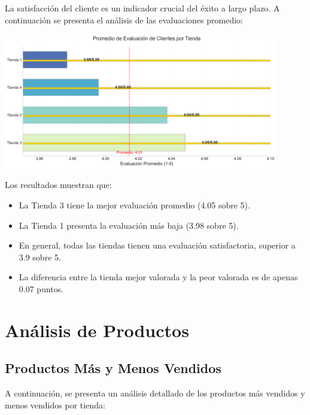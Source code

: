 \documentclass[12pt,a4paper]{report}\usepackage[spanish]{babel}\usepackage[utf8]{inputenc}\usepackage{graphicx}\usepackage{geometry}\usepackage{xcolor}\usepackage{tikz}\usepackage{pgfplots}\usepackage{booktabs}\usepackage{multicol}\usepackage{hyperref}\usepackage{pgf-pie}
\begin{document}
La satisfacción del cliente es un indicador crucial del éxito a largo plazo. A continuación se presenta el análisis de las evaluaciones promedio:

\begin{center}
\includegraphics[width=0.9\textwidth]{3_evaluacion_clientes.png}
\end{center}

Los resultados muestran que:

\begin{itemize}
    \item La Tienda 3 tiene la mejor evaluación promedio (4.05 sobre 5).
    \item La Tienda 1 presenta la evaluación más baja (3.98 sobre 5).
    \item En general, todas las tiendas tienen una evaluación satisfactoria, superior a 3.9 sobre 5.
    \item La diferencia entre la tienda mejor valorada y la peor valorada es de apenas 0.07 puntos.
\end{itemize}

\chapter{Análisis de Productos}

\section{Productos Más y Menos Vendidos}

A continuación, se presenta un análisis detallado de los productos más vendidos y menos vendidos por tienda:
\end{document}

